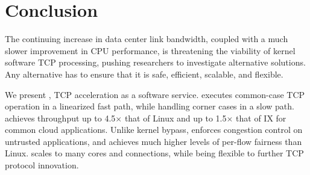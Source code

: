 \section{Conclusion}

The continuing increase in data center link bandwidth, coupled with a
much slower improvement in CPU performance, is threatening the
viability of kernel software TCP processing, pushing researchers to
investigate alternative solutions. Any alternative has to ensure that
it is safe, efficient, scalable, and flexible.

We present \taas, TCP acceleration as a software service. \taas
executes common-case TCP operation in a linearized fast path, while
handling corner cases in a slow path.  \taas achieves throughput up to
4.5$\times$ that of Linux and up to 1.5$\times$ that of IX for common
cloud applications.
Unlike kernel bypass, \taas enforces congestion control on untrusted
applications, and achieves much higher levels of per-flow fairness
than Linux. \taas scales to many cores and connections, while being
flexible to further TCP protocol innovation.
